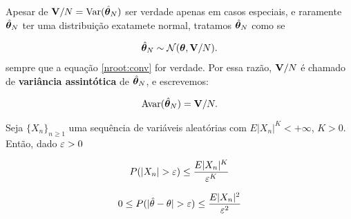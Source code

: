 \documentclass[11pt, oneside, a4paper, article]{article}
\numberwithin{equation}{section}
\begin{document}
\begin{description}
\begin{remark}
	Apesar de $\mathbf{V}/N = \text{Var}(\hat{\boldsymbol{\theta}}_{N})$ ser verdade apenas em casos especiais, e raramente $\hat{\boldsymbol{\theta}}_{N}$ ter uma distribuição exatamete normal, tratamos $\hat{\boldsymbol{\theta}}_{N}$ como se 

	\vspace{-1 em}
	\begin{align}\label{eq:3.4}
		\hat{\boldsymbol{\theta}}_{N} \sim \mathcal{N}(\boldsymbol{\theta}, \mathbf{V}/N).
	\end{align}
	sempre que a equação \eqref{nroot:conv} for verdade.
	Por essa razão, $\mathbf{V}/N$ é chamado de \textbf{variância assintótica} de $\hat{\boldsymbol{\theta}}_{N}$, e escrevemos:

	\vspace{-1 em}
	\begin{align}\label{eq:3.5}
		\text{Avar}(\hat{\boldsymbol{\theta}}_{N}) = \mathbf{V}/N.
	\end{align}

\end{remark}

\hline
\vspace{1 ex}

\begin{defn}

	Seja
	$\{ X_{n} \}_{n \geq 1}$ 
	uma sequência de variáveis aleatórias com
	$E|X_{n}|^{K} < +\infty$, $K>0$. 
	Então, dado $\varepsilon >0$

	\vspace{-1 em}
	\begin{align*}
		P(| X_{n} | > \varepsilon ) \leq \frac{E|X_{n}|^{K}}{\varepsilon^{K}}
	\end{align*}
\end{defn}

\begin{defn} %

	\begin{align*}
		0 \leq P(| \hat{\theta} - \theta | > \varepsilon ) \leq \frac{E|X_{n}|^{2}}{\varepsilon^{2}}
	\end{align*}
\end{defn}


\end{description}
\end{document}
